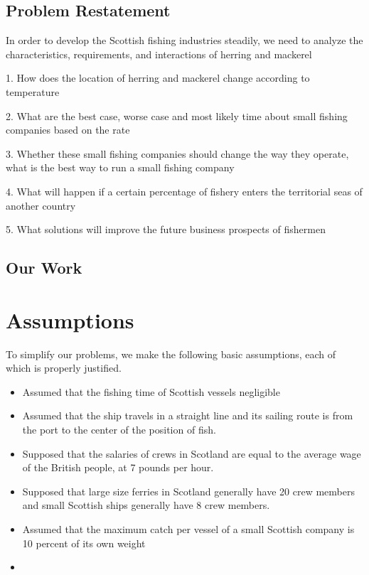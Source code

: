 \documentclass{mcmthesis}
\begin{document}

\subsection{Problem Restatement}
In order to develop the Scottish fishing industries steadily,   we need to analyze the characteristics, requirements, and interactions of herring and mackerel

1.    How does the location of herring and mackerel change according to temperature

2.    What are the best case, worse case and most likely time about  small fishing companies  based on the rate 


3.    Whether these small fishing companies should change the way they operate, what is the best way to run a small fishing company
 
4.    What will happen if a certain percentage of fishery enters the territorial seas of another country

5.    What solutions will improve the future business prospects of fishermen



\subsection{Our Work}


\section{Assumptions}
To simplify our problems, we make the following basic assumptions, each of which is properly justified.
\begin{itemize}
\item 
Assumed that the fishing time of Scottish vessels negligible
\item 
Assumed that the ship travels in a straight line and its sailing route is from the port to the center of the position of fish.
\item 
Supposed that the salaries of crews in Scotland are equal to the average wage of the British people, at 7 pounds per hour.
\item 
Supposed that large size ferries in Scotland generally have 20 crew members and small Scottish ships generally have 8 crew members.
\item 
Assumed that the maximum catch per vessel of a small Scottish company is 10 percent of its own weight
\item 

\end{itemize}
\end{document}
